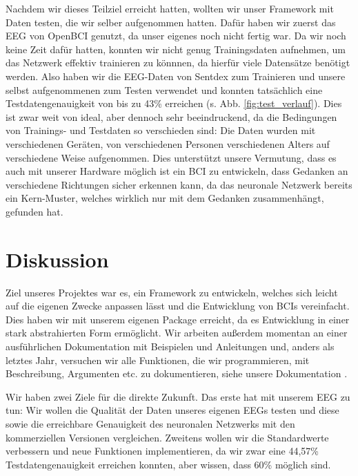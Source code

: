 \documentclass[10pt]{article}
\begin{document}
Nachdem wir dieses Teilziel erreicht hatten, wollten wir unser Framework mit Daten testen, die wir selber aufgenommen hatten. 
Dafür haben wir zuerst das EEG von OpenBCI genutzt, da unser eigenes noch nicht fertig war.
Da wir noch keine Zeit dafür hatten, konnten wir nicht genug Trainingsdaten aufnehmen, um das Netzwerk effektiv trainieren zu könnnen, da hierfür viele Datensätze benötigt werden.
Also haben wir die EEG-Daten von Sentdex zum Trainieren und unsere selbst aufgenommenen zum Testen verwendet und konnten tatsächlich eine Testdatengenauigkeit von bis zu 43\% erreichen (s. Abb. \ref{fig:test_verlauf}).
Dies ist zwar weit von ideal, aber dennoch sehr beeindruckend, da die Bedingungen von Trainings- und Testdaten so verschieden sind:
Die Daten wurden mit verschiedenen Geräten, von verschiedenen Personen verschiedenen Alters auf verschiedene Weise aufgenommen.
Dies unterstützt unsere Vermutung, dass es auch mit unserer Hardware möglich ist ein BCI zu entwickeln, dass Gedanken an verschiedene Richtungen sicher erkennen kann, da das neuronale Netzwerk bereits ein Kern-Muster, welches wirklich nur mit dem Gedanken zusammenhängt, gefunden hat.


\section{Diskussion}

Ziel unseres Projektes war es, ein Framework zu entwickeln, welches sich leicht auf die eigenen Zwecke anpassen lässt und die Entwicklung von BCIs vereinfacht. 
Dies haben wir mit unserem eigenen Package erreicht, da es Entwicklung in einer stark abstrahierten Form ermöglicht.
Wir arbeiten außerdem momentan an einer ausführlichen Dokumentation mit Beispielen und Anleitungen und, anders als letztes Jahr, versuchen wir alle Funktionen, die wir programmieren, mit Beschreibung, Argumenten etc. zu dokumentieren, siehe unsere Dokumentation \cite{BCIInterfaceDocs}.

Wir haben zwei Ziele für die direkte Zukunft.
Das erste hat mit unserem EEG zu tun: 
Wir wollen die Qualität der Daten unseres eigenen EEGs testen und diese sowie die erreichbare Genauigkeit des neuronalen Netzwerks mit den kommerziellen Versionen vergleichen.
Zweitens wollen wir die Standardwerte verbessern und neue Funktionen implementieren, da wir zwar eine 44,57\% Testdatengenauigkeit erreichen konnten, aber wissen, dass 60\% möglich sind.
\end{document}
